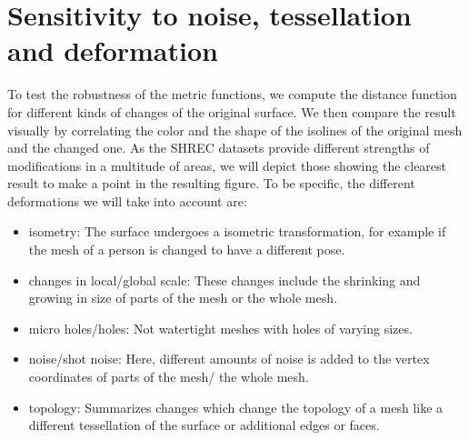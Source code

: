 \section{Sensitivity to noise, tessellation and deformation}
To test the robustness of the metric functions, we compute the distance function for different kinds of changes of the original surface.
We then compare the result visually by correlating the color and the shape of the isolines of the original mesh and the changed one.
As the SHREC datasets provide different strengths of modifications in a multitude of areas, we will depict those showing the clearest result to make a point in the resulting figure.
To be specific, the different deformations we will take into account are:
\begin{itemize}
	\item isometry: The surface undergoes a isometric transformation, for example if the mesh of a person is changed to have a different pose.
	\item changes in local/global scale: These changes include the shrinking and growing in size of parts of the mesh or the whole mesh.
	\item micro holes/holes: Not watertight meshes with holes of varying sizes.
	\item noise/shot noise: Here, different amounts of noise is added to the vertex coordinates of parts of the mesh/ the whole mesh.
	\item topology: Summarizes changes which change the topology of a mesh like a different tessellation of the surface or  additional edges or faces.
\end{itemize}

